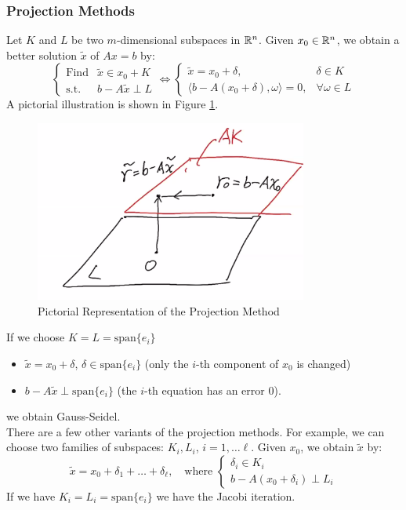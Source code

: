 \documentclass[../main/main.tex]{subfiles}
\begin{document}
\subsubsection{Projection Methods}
Let $K$ and $L$ be two $m$-dimensional subspaces in $\mathbb{R} ^{n}$. Given $x_{0} \in \mathbb{R} ^{n}$, we obtain a better solution $\tilde{x}$ of $Ax = b$ by: \[
\begin{cases}
  \text{Find} &\tilde{x}\in x_{0}+K \\
  \text{s.t.} &b-A\tilde{x}\perp L
\end{cases}
\iff
\begin{cases}
 \tilde{x}= x_{0}+\delta , & \delta  \in K \\
 \langle b-A(x_{0}+\delta), \omega \rangle = 0, & \forall \omega  \in L
\end{cases}
\]
A pictorial illustration is shown in Figure \ref{3-2-proj}.
\begin{figure}[ht]
  \centering
  \includegraphics[width=0.8\textwidth]{../images/3-2-proj}
  \caption{Pictorial Representation of the Projection Method \label{3-2-proj} }
\end{figure}


If we choose  $K = L = \text{span}\{ e_{i}\}$
        \begin{itemize}
\item $\tilde{x} = x_{0}+\delta $, $\delta   \in\text{span}\{ e_{i}\} $ (only the $i$-th component of $x_{0}$ is changed)
                \item $b-A\tilde{x} \perp \text{span}\{ e_{i}\}$ (the $i$-th equation has an error $0$).
        \end{itemize}
        we obtain Gauss-Seidel.\\

        There are a few other variants of the projection methods. For example, we can choose two families of subspaces: $K_{i},L_{i}$, $i= 1, \ldots  \ell $. Given $x_{0}$, we obtain $\tilde{x}$ by: \[
          \tilde{x} = x_{0}+\delta_{1}+\ldots +\delta_{\ell}, \quad \text{where }\begin{cases}
            \delta _{i}\in K_{i} \\
            b-A(x_{0}+ \delta_{i})\perp L_{i}
\end{cases}
        \]
        If we have $K_{i}=L_{i}=\text{span}\{ e_{i}\} $ we have the Jacobi iteration.\\
\end{document}
